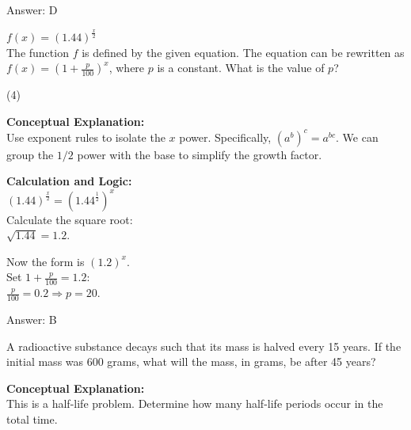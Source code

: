 \documentclass[11pt,paper=a4,answers]{exam}
\begin{document}
\begin{questions}
\begin{solution}
\vspace{25pt}

Answer: \colorbox{yellow!100}{D}
\end{solution}

\vspace{40pt}

\question
$f(x) = (1.44)^{\frac{x}{2}}$ \\
The function $f$ is defined by the given equation. The equation can be rewritten as $f(x) = (1 + \frac{p}{100})^x$, where $p$ is a constant. What is the value of $p$?
\begin{tasks}(4)
\end{tasks}

\begin{solution}
\textbf{Conceptual Explanation:} \\
Use exponent rules to isolate the $x$ power. Specifically, $(a^b)^c = a^{bc}$. We can group the $1/2$ power with the base to simplify the growth factor.

\vspace{20pt}

\textbf{Calculation and Logic:} \\
$(1.44)^{\frac{x}{2}} = (1.44^{\frac{1}{2}})^x$ \\
Calculate the square root: \\
$\sqrt{1.44} = 1.2$.

\vspace{10pt}

Now the form is $(1.2)^x$. \\
Set $1 + \frac{p}{100} = 1.2$: \\
$\frac{p}{100} = 0.2 \Rightarrow p = 20$.

\vspace{25pt}

Answer: \colorbox{yellow!100}{B}
\end{solution}

\vspace{40pt}

\question
A radioactive substance decays such that its mass is halved every 15 years. If the initial mass was 600 grams, what will the mass, in grams, be after 45 years?

\begin{solution}
\textbf{Conceptual Explanation:} \\
This is a half-life problem. Determine how many half-life periods occur in the total time.


\end{solution}
\end{questions}
\end{document}
